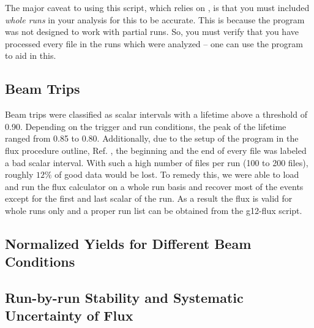 The major caveat to using this script, which relies on , is that you must included \emph{whole runs} in your analysis for this to be accurate. This is because the  program was not designed to work with partial runs. So, you must verify that you have processed every file in the runs which were analyzed -- one can use the  program to aid in this.

\subsection{\label{sec:flux.trips}Beam Trips}

Beam trips were classified as scalar intervals with a lifetime above a threshold of 0.90. Depending on the trigger and run conditions, the peak of the lifetime ranged from 0.85 to 0.80. Additionally, due to the setup of the program in the flux procedure outline, Ref. \cite{clas.flux.note}, the beginning and the end of every file was labeled a bad scalar interval. With such a high number of files per run (100 to 200 files), roughly $12\%$ of good data would be lost. To remedy this, we were able to load and run the flux calculator on a whole run basis and recover most of the events except for the first and last scalar of the run. As a result the flux is valid for whole runs only and a proper run list can be obtained from the g12-flux script.

\FloatBarrier


\subsection{\label{sec:flux.normyields}Normalized Yields for Different Beam Conditions}

\FloatBarrier



\subsection{\label{sec:flux.runbyrun}Run-by-run Stability and Systematic Uncertainty of Flux}

\FloatBarrier
